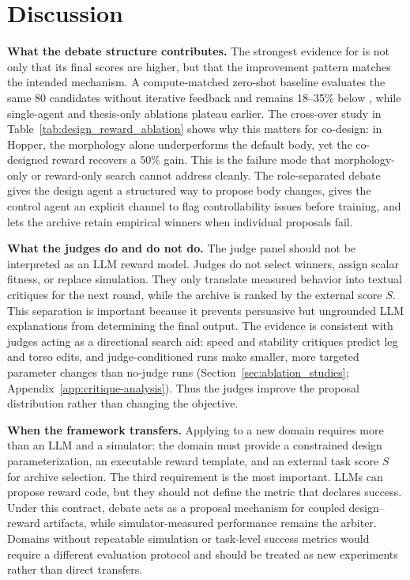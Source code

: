 \section{Discussion}
\label{sec:discussion}

\textbf{What the debate structure contributes.}
The strongest evidence for \abbrev{} is not only that its final scores are higher, but that the improvement pattern matches the intended mechanism. A compute-matched zero-shot baseline evaluates the same 80 candidates without iterative feedback and remains 18--35\% below \abbrev{}, while single-agent and thesis-only ablations plateau earlier. The cross-over study in Table~\ref{tab:design_reward_ablation} shows why this matters for co-design: in Hopper, the \abbrev{} morphology alone underperforms the default body, yet the co-designed reward recovers a 50\% gain. This is the failure mode that morphology-only or reward-only search cannot address cleanly. The role-separated debate gives the design agent a structured way to propose body changes, gives the control agent an explicit channel to flag controllability issues before training, and lets the archive retain empirical winners when individual proposals fail.

\textbf{What the judges do and do not do.}
The judge panel should not be interpreted as an LLM reward model. Judges do not select winners, assign scalar fitness, or replace simulation. They only translate measured behavior into textual critiques for the next round, while the archive is ranked by the external score $S$. This separation is important because it prevents persuasive but ungrounded LLM explanations from determining the final output. The evidence is consistent with judges acting as a directional search aid: speed and stability critiques predict leg and torso edits, and judge-conditioned runs make smaller, more targeted parameter changes than no-judge runs (Section~\ref{sec:ablation_studies}; Appendix~\ref{app:critique-analysis}). Thus the judges improve the proposal distribution rather than changing the objective.

\textbf{When the framework transfers.}
Applying \abbrev{} to a new domain requires more than an LLM and a simulator: the domain must provide a constrained design parameterization, an executable reward template, and an external task score $S$ for archive selection. The third requirement is the most important. LLMs can propose reward code, but they should not define the metric that declares success. Under this contract, debate acts as a proposal mechanism for coupled design--reward artifacts, while simulator-measured performance remains the arbiter. Domains without repeatable simulation or task-level success metrics would require a different evaluation protocol and should be treated as new experiments rather than direct transfers.
